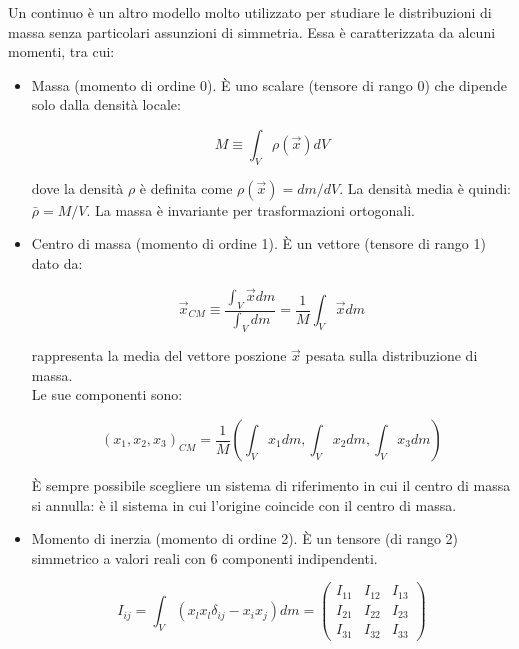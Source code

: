 \documentclass[a4paper,12pt]{book}
\begin{document}
Un continuo è un altro modello molto utilizzato per studiare le distribuzioni di massa senza particolari assunzioni di simmetria.
Essa è caratterizzata da alcuni momenti, tra cui:

\begin{itemize}
    \item Massa (momento di ordine 0). È uno scalare (tensore di rango 0) che dipende solo dalla densità locale:

    \begin{equation}
        M \equiv \int_V \rho (\vec{x}) dV
    \end{equation}

    \noindent
    dove la densità $\rho$ è definita come $\rho(\vec{x}) = dm/dV$.
    La densità media è quindi: $\bar{\rho} = M/V$.
    La massa è invariante per trasformazioni ortogonali.
    
    \item Centro di massa (momento di ordine 1). È un vettore (tensore di rango 1) dato da:

    \begin{equation}
        \vec{x}_{CM} \equiv \frac{\int_V \vec{x}dm}{\int_V dm} = \frac{1}{M} \int_V \vec{x} dm
    \end{equation}

    \noindent rappresenta la media del vettore poszione $\vec{x}$ pesata sulla distribuzione di massa.\\

    \noindent
    Le sue componenti sono:

    \begin{equation}
        (x_1, x_2, x_3)_{CM} = \frac{1}{M} \left(\int_V x_1 dm , \int_V x_2 dm , \int_V x_3 dm\right)
    \end{equation}

    È sempre possibile scegliere un sistema di riferimento in cui il centro di massa si annulla:
    è il sistema in cui l'origine coincide con il centro di massa.

    \item Momento di inerzia (momento di ordine 2). È un tensore (di rango 2) simmetrico a valori reali con 6 componenti indipendenti.
    
    \begin{equation}
        I_{ij} = \int_V (x_lx_l \delta_{ij} - x_ix_j)dm = \begin{pmatrix}
            I_{11} & I_{12} & I_{13} \\ I_{21} & I_{22} & I_{23} \\ I_{31} & I_{32} & I_{33}
        \end{pmatrix}
        \label{eq:inerzia}
    \end{equation}


\end{itemize}
\end{document}

